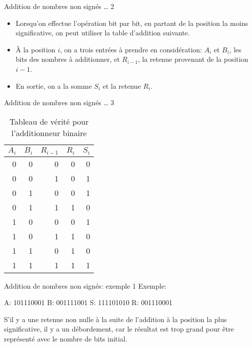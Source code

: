 \documentclass[presentation]{beamer}
\begin{document}
\begin{frame}[label={sec:org13c6f4f}]{Addition de nombres non signés \ldots{} 2}
\begin{itemize}
\item Lorsqu'on effectue l'opération bit par bit, en partant de la position la moins significative, on peut utiliser la table d'addition suivante.

\item À la position \(i\), on a trois entrées à prendre en considération: \(A_{i}\) et \(B_{i}\), les bits des nombres à additionner, et \(R_{i-1}\), la retenue provenant de la position \(i-1\).

\item En sortie, on a la somme \(S_{i}\) et la retenue \(R_{i}\).
\end{itemize}
\end{frame}

\begin{frame}[label={sec:org7904c24}]{Addition de nombres non signés \ldots{} 3}
\begin{table}[htbp]
\caption{\label{tab:org38c1352}Tableau de vérité pour l'additionneur binaire}
\centering
\begin{tabular}{rrrrr}
\(A_{i}\) & \(B_{i}\) & \(R_{i-1}\) & \(R_{i}\) & \(S_{i}\)\\[0pt]
\hline
0 & 0 & 0 & 0 & 0\\[0pt]
0 & 0 & 1 & 0 & 1\\[0pt]
0 & 1 & 0 & 0 & 1\\[0pt]
0 & 1 & 1 & 1 & 0\\[0pt]
1 & 0 & 0 & 0 & 1\\[0pt]
1 & 0 & 1 & 1 & 0\\[0pt]
1 & 1 & 0 & 1 & 0\\[0pt]
1 & 1 & 1 & 1 & 1\\[0pt]
\end{tabular}
\end{table}
\end{frame}

\begin{frame}[label={sec:org9d70602}]{Addition de nombres non signés: exemple 1}
Exemple:

A: 101110001
B: 001111001
S: 111101010
R: 001110001

S'il y a une retenue non nulle à la suite de l'addition à la position la plus significative, il y a un \alert{débordement}, car le résultat est trop grand pour être représenté avec le nombre de bits initial.
\end{frame}
\end{document}

